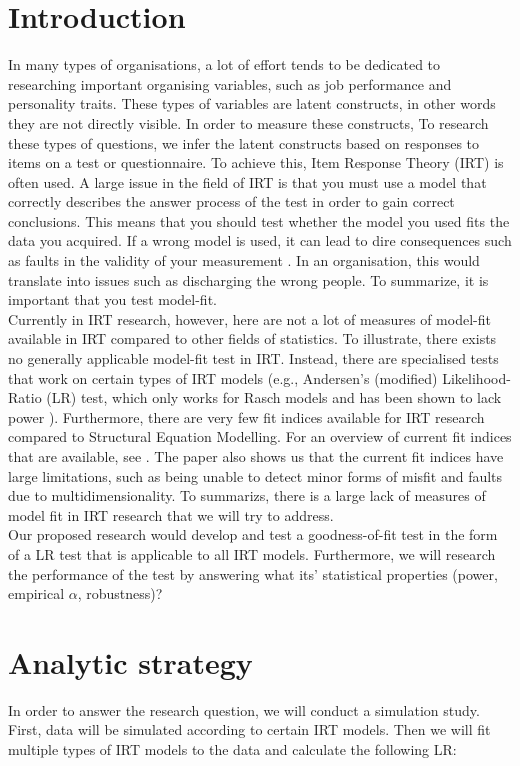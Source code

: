 \documentclass{article}
\begin{document}
\part{Introduction}
In many types of organisations, a lot of effort tends to be dedicated to researching important organising variables, such as job performance and personality traits. These types of variables are latent constructs, in other words they are not directly visible. In order to measure these constructs, To research these types of questions, we infer the latent constructs based on responses to items on a test or questionnaire. To achieve this, Item Response Theory (IRT) is often used. A large issue in the field of IRT is that you must use a model that correctly describes the answer process of the test in order to gain correct conclusions. This means that you should test whether the model you used fits the data you acquired. If a wrong model is used, it can lead to dire consequences such as faults in the validity of your measurement \autocite{consq1}. In an organisation, this would translate into issues such as discharging the wrong people. To summarize, it is important that you test model-fit. \\
\indent Currently in IRT research, however, here are not a lot of measures of model-fit available in IRT compared to other fields of statistics. To illustrate, there exists no generally applicable model-fit test in IRT. Instead, there are specialised tests that work on certain types of IRT models (e.g., Andersen's (modified) Likelihood-Ratio (LR) test, which only works for Rasch models and has been shown to lack power \autocite{ref2}). Furthermore, there are very few fit indices available for IRT research compared to Structural Equation Modelling. For an overview of current fit indices that are available, see \textcite{ref1}. The paper also shows us that the current fit indices have large limitations, such as being unable to detect minor forms of misfit and faults due to multidimensionality. To summarizs, there is a large lack of measures of model fit in IRT research that we will try to address.\\
\indent Our proposed research would develop and test a goodness-of-fit test in the form of a LR test that is applicable to all IRT models. Furthermore, we will research the performance of the test by answering what its' statistical properties (power, empirical $\alpha$, robustness)?

\part{Analytic strategy}
In order to answer the research question, we will conduct a simulation study. 
First, data will be simulated according to certain IRT models. Then we will fit multiple types of IRT models to the data and calculate the following LR:
\end{document}
